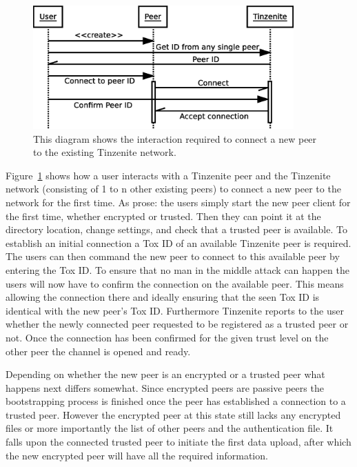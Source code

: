 \begin{figure}[htp]
\centering
    \includegraphics[width=10cm]{diagram/sequence_new_connect}
\caption[New Connection Sequence Diagram]{This diagram shows the interaction required to connect a new peer to the existing Tinzenite network.}
\label{diagram:new_connection}
\end{figure}

Figure~\ref{diagram:new_connection} shows how a user interacts with a Tinzenite peer and the Tinzenite network (consisting of 1 to n other existing peers) to connect a new peer to the network for the first time.
As prose: the users simply start the new peer client for the first time, whether encrypted or trusted.
Then they can point it at the directory location, change settings, and check that a trusted peer is available.
To establish an initial connection a Tox ID of an available Tinzenite peer is required.
The users can then command the new peer to connect to this available peer by entering the Tox ID.
To ensure that no man in the middle attack can happen the users will now have to confirm the connection on the available peer.
This means allowing the connection there and ideally ensuring that the seen Tox ID is identical with the new peer's Tox ID.
Furthermore Tinzenite reports to the user whether the newly connected peer requested to be registered as a trusted peer or not.
Once the connection has been confirmed for the given trust level on the other peer the channel is opened and ready.

Depending on whether the new peer is an encrypted or a trusted peer what happens next differs somewhat.
Since encrypted peers are passive peers the bootstrapping process is finished once the peer has established a connection to a trusted peer.
However the encrypted peer at this state still lacks any encrypted files or more importantly the list of other peers and the authentication file.
It falls upon the connected trusted peer to initiate the first data upload, after which the new encrypted peer will have all the required information.

